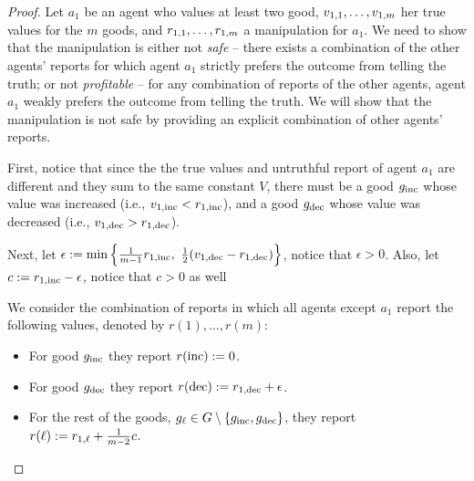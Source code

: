 \begin{proof}
    Let $a_1$ be an agent who values at least two good, $v_{1,1}, \ldots, v_{1,m}$ her true values for the $m$ goods, and $r_{1,1}, \ldots, r_{1,m}$ a manipulation for $a_1$.
    We need to show that the manipulation is either not \emph{safe} -- there exists a combination of the other agents' reports for which agent $a_1$ strictly prefers the outcome from telling the truth; or not \emph{profitable} -- for any combination of reports of the other agents, agent $a_1$ weakly prefers the outcome from telling the truth. 
    We will show that the manipulation is not safe by providing an explicit combination of other agents' reports.

    First, notice that since the the true values and untruthful report of agent $a_1$ are different and they sum to the same constant $V$, there must be a good $g_{\mathrm{inc}}$ whose value was increased (i.e., $ v_{1,\mathrm{inc}} < r_{1,\mathrm{inc}}$), and a good $g_{\mathrm{dec}}$ whose value was decreased (i.e., $ v_{1,\mathrm{dec}} > r_{1,\mathrm{dec}}$).
    
    Next, let $\epsilon := \min \left\{\frac{1}{m-1}r_{1,\mathrm{inc}},~ \frac{1}{2}(v_{1,\mathrm{dec}} - r_{1,\mathrm{dec}})\right\}$, notice that $\epsilon > 0$.
    Also, let $c := r_{1,\mathrm{inc}} - \epsilon$, notice that $c > 0$ as well 

    We consider the combination of reports in which all agents except $a_1$ report the following values, denoted by $r(1), \ldots, r(m)$:
    \begin{itemize}
        \item For good $g_{\mathrm{inc}}$ they report $r(\mathrm{inc}) := 0$.

        \item For good $g_{\mathrm{dec}}$ they report 
        $r(\mathrm{dec}) := r_{1,\mathrm{dec}} + \epsilon$.

        \item For the rest of the goods, $g_\ell \in G \setminus \{g_{\mathrm{inc}}, g_{\mathrm{dec}}\}$, they report 
        $r(\ell) := r_{1,\ell} + \frac{1}{m-2} c$.
        

\end{itemize}
\end{proof}
